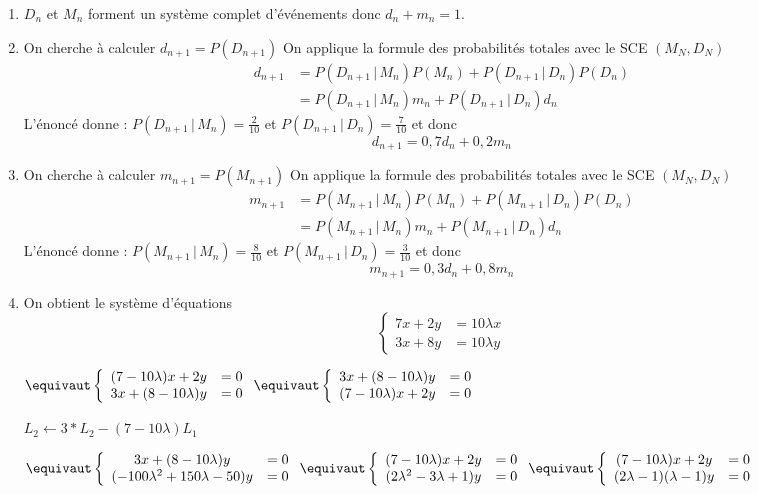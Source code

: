 


\begin{correction}
\begin{enumerate}
\item $D_n$ et $M_n$ forment un système complet d'événements donc $
d_n+m_n=1$. 
\item On cherche à calculer $d_{n+1} =P(D_{n+1})$ 
On applique la formule des probabilités totales avec le SCE $(M_N,D_N)$
\begin{align*}
d_{n+1} &= P(D_{n+1}\, |\, M_n) P(M_n) +P(D_{n+1}\, |\, D_n) P(D_n)\\
			&= P(D_{n+1}\, |\, M_n) m_n +P(D_{n+1}\, |\, D_n) d_n
\end{align*}
L'énoncé donne : $ P(D_{n+1}\, |\, M_n) = \frac{2}{10}$ et  $ P(D_{n+1}\, |\, D_n) = \frac{7}{10}$
et donc 
$$d_{n+1} = 0,7 d_n  +0,2 m_n$$

\item On cherche à calculer $m_{n+1} =P(M_{n+1})$ 
On applique la formule des probabilités totales avec le SCE $(M_N,D_N)$
\begin{align*}
m_{n+1} &= P(M_{n+1}\, |\, M_n) P(M_n) +P(M_{n+1}\, |\, D_n) P(D_n)\\
			&= P(M_{n+1}\, |\, M_n) m_n +P(M_{n+1}\, |\, D_n) d_n
\end{align*}
L'énoncé donne : $ P(M_{n+1}\, |\, M_n) = \frac{8}{10}$ et  $ P(M_{n+1}\, |\, D_n) = \frac{3}{10}$
et donc 
$$m_{n+1} = 0,3 d_n  +0,8 m_n$$

\item 
On obtient le système d'équations
$$\left\{  
\begin{array}{cc}
7x +2y  &=10\lambda x\\
3x +8y  &=10\lambda y
\end{array}\right.$$



$
\equivaut
\left\{  
\begin{array}{cc}
(7-10\lambda) x +2y  &=0\\
3x +(8-10\lambda)y  &=0
\end{array}\right.
\equivaut 
\left\{  
\begin{array}{cc}
3x +(8-10\lambda)y  &=0\\
(7-10\lambda) x +2y  &=0
\end{array}\right.$

$L_2 \leftarrow3*L_2- (7-10\lambda)L_1$

$
\equivaut 
\left\{  
\begin{array}{cc}
3x +(8-10\lambda)y  &=0\\
(-100\lambda^2 +150\lambda -50 )y  &=0
\end{array}\right.
\equivaut
\left\{  
\begin{array}{cc}
(7-10\lambda) x +2y  &=0\\
(2\lambda^2 -3\lambda +1) y  &=0
\end{array}\right.
\equivaut
\left\{  
\begin{array}{cc}
(7-10\lambda) x +2y  &=0\\
(2\lambda-1)(\lambda-1) y  &=0
\end{array}\right.
$


\end{enumerate}
\end{correction}
